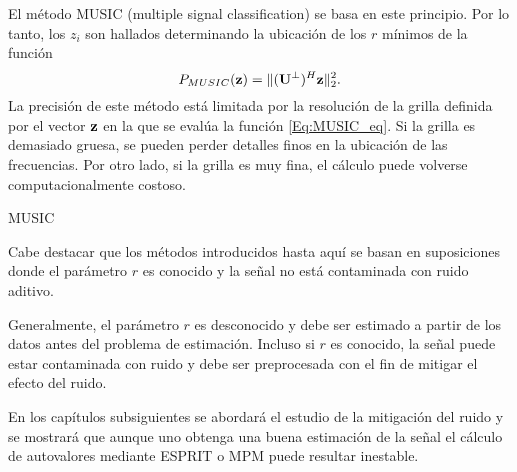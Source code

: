 	El método MUSIC (multiple signal classification) \cite{Schmidt1986} se basa en este principio. Por lo tanto, los $z_i$ son hallados determinando la ubicación de los $r$ mínimos de la función 
	\begin{equation} P_{MUSIC}(\mathbf{z}) = \|(\mathbf{U}^{\perp})^H\mathbf{z}\|_2^2.\label{Eq:MUSIC_eq}\end{equation}
	La precisión de este método está limitada por la resolución de la grilla definida por el vector $\mathbf{z}$ en la que se evalúa la función \eqref{Eq:MUSIC_eq}. Si la grilla es demasiado gruesa, se pueden perder detalles finos en la ubicación de las frecuencias. Por otro lado, si la grilla es muy fina, el cálculo puede volverse computacionalmente costoso. 

	\begin{algorithm}
		\caption{MUSIC}
		\begin{algorithmic}[1]
		\end{algorithmic}
		\label{Algorithm_music}
	\end{algorithm}	

	Cabe destacar que los métodos introducidos hasta aquí se basan en suposiciones donde el parámetro $r$ es conocido y la señal no está contaminada con ruido aditivo. 

	Generalmente, el parámetro $r$ es desconocido y debe ser estimado a partir de los datos antes del problema de estimación. Incluso si $r$ es conocido, la señal puede estar contaminada con ruido y debe ser preprocesada con el fin de mitigar el efecto del ruido. 

	En los capítulos subsiguientes se abordará el estudio de la mitigación del ruido y se mostrará que aunque uno obtenga una buena estimación de la señal el cálculo de autovalores mediante ESPRIT o MPM puede resultar inestable. %

        

        
        
        
       
            


